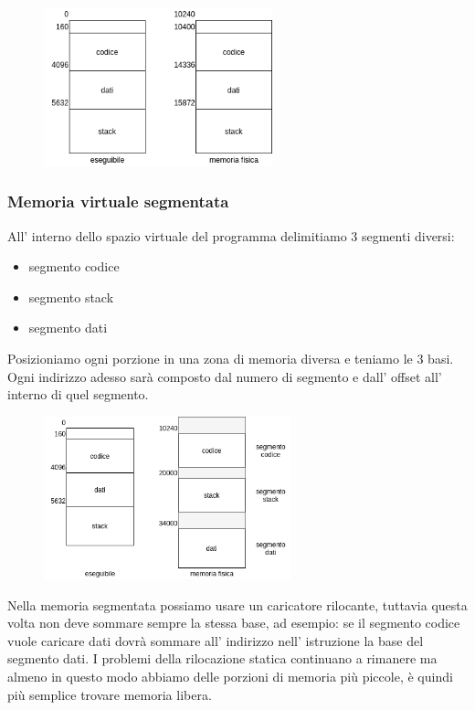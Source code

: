 \begin{figure}[H]
    \centering
    \includegraphics[width=250px]{images/9_Gestione_della_memoria/spazio_unico.png}
\end{figure}

\subsubsection{Memoria virtuale segmentata}
All' interno dello spazio virtuale del programma delimitiamo 3 segmenti diversi:
\begin{itemize}
    \item segmento codice
    \item segmento stack
    \item segmento dati
\end{itemize}
Posizioniamo ogni porzione in una zona di memoria diversa e teniamo le 3 basi.
Ogni indirizzo adesso sarà composto dal numero di segmento e dall' offset all' interno di quel segmento.
\begin{figure}[H]
    \centering
    \includegraphics[width=270px]{images/9_Gestione_della_memoria/spazio_segmentato.png}
\end{figure}

Nella memoria segmentata possiamo usare un caricatore rilocante, tuttavia questa volta non deve sommare sempre la stessa base, ad esempio: se il segmento codice vuole caricare dati dovrà sommare all' indirizzo nell' istruzione la base del segmento dati.
I problemi della rilocazione statica continuano a rimanere ma almeno in questo modo abbiamo delle porzioni di memoria più piccole, è quindi più semplice trovare memoria libera.

